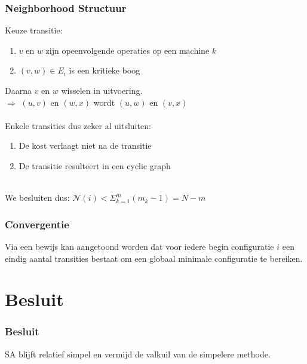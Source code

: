\documentclass
   [kulak] %
   {kulakbeamer}
\newcommand\tab[1][1cm]{\hspace*{#1}}
\begin{document}
\begin{frame}
\frametitle{Neighborhood Structuur}
	Keuze transitie:\\
	\begin{enumerate}
		\item $v$ en $w$ zijn opeenvolgende operaties op een machine $k$\\
		\item $(v, w)\in E_i$ is een kritieke boog\\ 
	\end{enumerate}
	Daarna $v$ en $w$ wisselen in uitvoering.\\
	\tab $\Rightarrow$ $(u, v)$ en $(w, x)$ wordt $(u, w)$ en $(v, x)$\\~\\
	Enkele transities dus zeker al uitsluiten:\\
	\begin{enumerate}
		\item De kost verlaagt niet na de transitie\\
		\item De transitie resulteert in een cyclic graph\\
	\end{enumerate}
	~\\
	We besluiten dus: $\mathscr{N}(i) < \Sigma_{k=1}^m (m_k - 1) = N - m$
\end{frame}

\begin{frame}
\frametitle{Convergentie}
	Via een bewijs kan aangetoond worden dat voor iedere begin configuratie $i$ een eindig aantal transities bestaat om een globaal minimale configuratie te bereiken.
\end{frame}

\section{Besluit}
\begin{frame}
\frametitle{Besluit}
SA blijft relatief simpel en vermijd de valkuil van de simpelere methode.
\end{frame}
\end{document}
